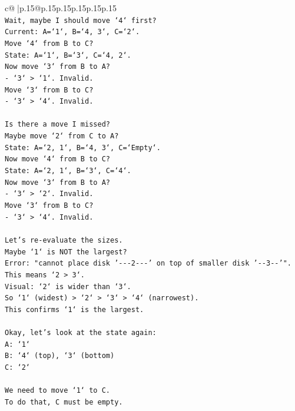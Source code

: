 \documentclass{article}
\begin{document}
{\begin{supertabular}{c@{$\;$}|p{.15\linewidth}@{}p{.15\linewidth}p{.15\linewidth}p{.15\linewidth}p{.15\linewidth}p{.15\linewidth}}
{{{\\ 
\texttt{Wait, maybe I should move `4` first?} \\
\texttt{Current: A=`1`, B=`4, 3`, C=`2`.} \\
\texttt{Move `4` from B to C?} \\
\texttt{State: A=`1`, B=`3`, C=`4, 2`.} \\
\texttt{Now move `3` from B to A?} \\
\texttt{{-} `3` > `1`. Invalid.} \\
\texttt{Move `3` from B to C?} \\
\texttt{{-} `3` > `4`. Invalid.} \\
\\ 
\texttt{Is there a move I missed?} \\
\texttt{Maybe move `2` from C to A?} \\
\texttt{State: A=`2, 1`, B=`4, 3`, C=`Empty`.} \\
\texttt{Now move `4` from B to C?} \\
\texttt{State: A=`2, 1`, B=`3`, C=`4`.} \\
\texttt{Now move `3` from B to A?} \\
\texttt{{-} `3` > `2`. Invalid.} \\
\texttt{Move `3` from B to C?} \\
\texttt{{-} `3` > `4`. Invalid.} \\
\\ 
\texttt{Let's re{-}evaluate the sizes.} \\
\texttt{Maybe `1` is NOT the largest?} \\
\texttt{Error: "cannot place disk '{-}{-}{-}2{-}{-}{-}' on top of smaller disk '{-}{-}3{-}{-}'".} \\
\texttt{This means `2 > 3`.} \\
\texttt{Visual: `2` is wider than `3`.} \\
\texttt{So `1` (widest) > `2` > `3` > `4` (narrowest).} \\
\texttt{This confirms `1` is the largest.} \\
\\ 
\texttt{Okay, let's look at the state again:} \\
\texttt{A: `1`} \\
\texttt{B: `4` (top), `3` (bottom)} \\
\texttt{C: `2`} \\
\\ 
\texttt{We need to move `1` to C.} \\
\texttt{To do that, C must be empty.} \\
}}}
\end{supertabular}}
\end{document}
